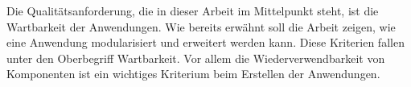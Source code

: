 Die Qualitätsanforderung, die in dieser Arbeit im Mittelpunkt steht, ist die Wartbarkeit der Anwendungen. Wie bereits erwähnt soll die Arbeit zeigen, wie 
eine Anwendung modularisiert und erweitert werden kann. Diese Kriterien fallen unter den Oberbegriff Wartbarkeit. Vor allem die Wiederverwendbarkeit von 
Komponenten ist ein wichtiges Kriterium beim Erstellen der Anwendungen.
